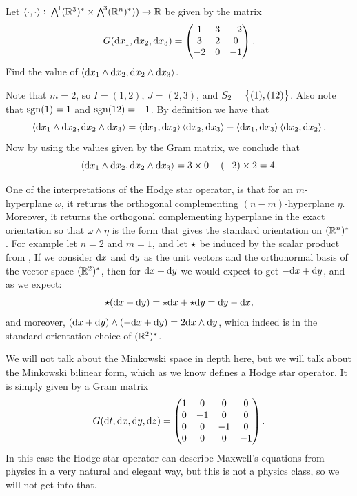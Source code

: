\documentclass[11pt,a4paper]{article}
\begin{document}
\begin{exercise}
  Let $\left\langle \cdot, \cdot \right\rangle \colon \bigwedge^{\!1}(\mathbb{R}^3)^* \times \bigwedge^{\!3}(\mathbb{R}^n)^*))
  \to \mathbb{R}$ be given by the matrix
  \[
    G(\dx_1,\dx_2,\dx_3) =
    \begin{pmatrix}
      1 & 3 & -2 \\
      3 & 2 & 0 \\
      -2 & 0 & -1
    \end{pmatrix}.
  \]
  Find the value of $\ip{\dx_1 \wedge \dx_2}{\dx_2 \wedge \dx_3}$.
\end{exercise}
\begin{solution}
  Note that $m = 2$, so $I = (1,2)$, $J = (2,3)$, and $S_2 = \left\{(1),(12)\right\}$.
  Also note that $\operatorname{sgn}(1) = 1$ and $\operatorname{sgn}(12) = -1$.
  By definition we have that
  \[
    \ip{\dx_1 \wedge \dx_2}{\dx_2 \wedge \dx_3} =
    \ip{\dx_1}{\dx_2} \ip{\dx_2}{\dx_3} -
    \ip{\dx_1}{\dx_3} \ip{\dx_2}{\dx_2}.
  \]
  Now by using the values given by the Gram matrix, we conclude that
  \[
    \ip{\dx_1 \wedge \dx_2}{\dx_2 \wedge \dx_3} =
    3 \times 0 -
    (- 2) \times 2 = 4.
  \]
\end{solution}

\begin{remark}
  One of the interpretations of the Hodge star operator,
  is that for an $m$-hyperplane $\omega$,
  it returns the orthogonal complementing $(n-m)$-hyperplane $\eta$.
  Moreover, it returns the orthogonal complementing hyperplane in
  the exact orientation so that $\omega \wedge \eta$ is the form
  that gives the standard orientation on $(\mathbb{R}^n)^*$.
  For example let $n = 2$ and $m = 1$,
  and let ${\mathnormal{\star}}$ be induced
  by the scalar product from ,
  If we consider $\dx$ and $\dy$ as the unit vectors and the orthonormal basis
  of the vector space $(\mathbb{R}^2)^*$,
  then for $\dx + \dy$ we would expect to get $-\dx + \dy$,
  and as we expect:
  \[
    \hodge(\dx + \dy) =
    \hodge \dx + \hodge \dy = \dy - \dx,
  \]
  and moreover, $(\dx + \dy) \wedge (-\dx + \dy) = 2 \dx \wedge \dy$,
  which indeed is in the standard orientation choice of $(\mathbb{R}^2)^*$.
\end{remark}

\begin{example}
  We will not talk about the Minkowski space in depth here,
  but we will talk about the Minkowski bilinear form,
  which as we know defines a Hodge star operator.
  It is simply given by a Gram matrix
  \[
    G(\dt,\dx,\dy,\dz) =
    \begin{pmatrix}
      1 & 0 & 0 & 0 \\
      0 & -1 & 0 & 0 \\
      0 & 0 & -1 & 0 \\
      0 & 0 & 0 & -1
    \end{pmatrix}.
  \]
  In this case the Hodge star operator can describe Maxwell's equations
  from physics in a very natural and elegant way,
  but this is not a physics class,
  so we will not get into that.
\end{example}
\end{document}
